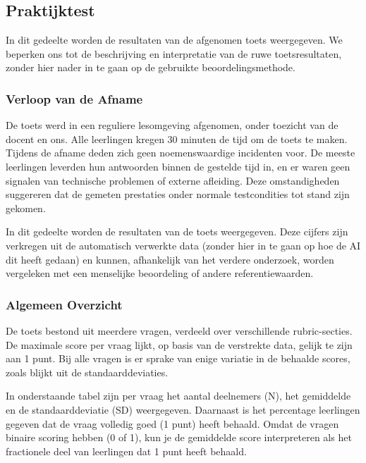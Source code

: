 \documentclass[12pt]{article}
\begin{document}
\pagebreak
\subsection{Praktijktest}
\begin{multicols}{2}
    

In dit gedeelte worden de resultaten van de afgenomen toets weergegeven. We beperken ons tot de beschrijving en interpretatie van de ruwe toetsresultaten, zonder hier nader in te gaan op de gebruikte beoordelingsmethode.

\subsubsection*{Verloop van de Afname}
De toets werd in een reguliere lesomgeving afgenomen, onder toezicht van de docent en ons. Alle leerlingen kregen 30 minuten de tijd om de toets te maken. Tijdens de afname deden zich geen noemenswaardige incidenten voor. De meeste leerlingen leverden hun antwoorden binnen de gestelde tijd in, en er waren geen signalen van technische problemen of externe afleiding. Deze omstandigheden suggereren dat de gemeten prestaties onder normale testcondities tot stand zijn gekomen.

In dit gedeelte worden de resultaten van de toets weergegeven. Deze cijfers zijn verkregen uit de automatisch verwerkte data (zonder hier in te gaan op hoe de AI dit heeft gedaan) en kunnen, afhankelijk van het verdere onderzoek, worden vergeleken met een menselijke beoordeling of andere referentiewaarden.

\subsubsection*{Algemeen Overzicht}
De toets bestond uit meerdere vragen, verdeeld over verschillende rubric-secties. De maximale score per vraag lijkt, op basis van de verstrekte data, gelijk te zijn aan 1 punt. Bij alle vragen is er sprake van enige variatie in de behaalde scores, zoals blijkt uit de standaarddeviaties.

\noindent In onderstaande tabel zijn per vraag het aantal deelnemers (N), het gemiddelde en de standaarddeviatie (SD) weergegeven. Daarnaast is het percentage leerlingen gegeven dat de vraag volledig goed (1 punt) heeft behaald. Omdat de vragen binaire scoring hebben (0 of 1), kun je de gemiddelde score interpreteren als het fractionele deel van leerlingen dat 1 punt heeft behaald.
\end{multicols}
\end{document}
